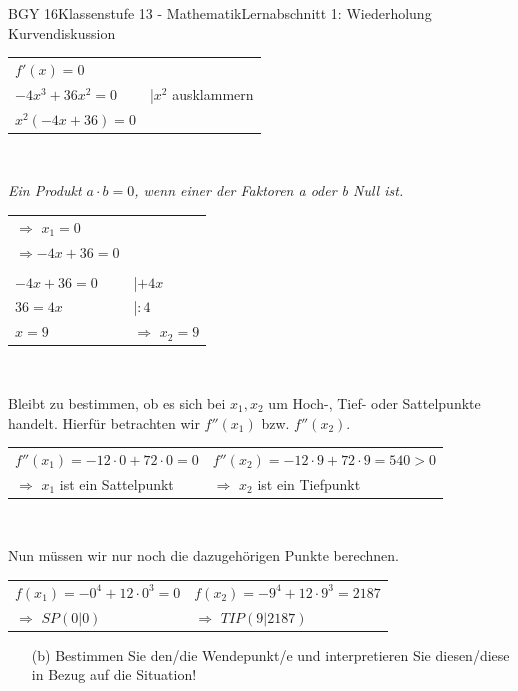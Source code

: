 \documentclass[oneside,openany,headings=optiontotoc,11pt,numbers=noenddot]{scrreprt}
\begin{document}
\begin{worksheet}{BGY 16}{Klassenstufe 13 - Mathematik}{Lernabschnitt 1: Wiederholung Kurvendiskussion}
\begin{framed}
\begin{tabularx}{\textwidth}{ll}
				\(f'(x) = 0\)\\
				\(-4x^3 + 36x^2 = 0\) & |\(x^2\) ausklammern\\
				\(x^2(-4x + 36) = 0\)\\
			\end{tabularx}\\
			\par\noindent
			\textit{Ein Produkt \(a\cdot{}b = 0\), wenn einer der Faktoren a oder b Null ist.}\\
			\par\noindent
			\begin{tabularx}{\textwidth}{ll}
				\(\Rightarrow\) \colorbox{green!5}{\( x_1 = 0\)}\\
				\(\Rightarrow -4x +36 = 0\)\\
				\\
				\(-4x+36 = 0\) & |\(+4x\)\\
				\(36 = 4x\) & |\(:4\)\\
				\(x = 9\) & \(\Rightarrow\) \colorbox{green!5}{\(x_2 = 9\)}\\
			\end{tabularx}\\
			\par\noindent
			Bleibt zu bestimmen, ob es sich bei \(x_1, x_2\) um Hoch-, Tief- oder Sattelpunkte handelt. Hierfür betrachten wir \(f''(x_1)\) bzw. \(f''(x_2)\).
			\begin{tabularx}{\textwidth}{XX}
				\(f''(x_1) = -12\cdot{}0 + 72\cdot{}0 = 0\) & \(f''(x_2) = -12\cdot{}9 + 72\cdot{}9 = 540 > 0\)\\
				\(\Rightarrow\) \colorbox{green!5}{\(x_1\) ist ein Sattelpunkt} & \(\Rightarrow\) \colorbox{green!5}{\(x_2\) ist ein Tiefpunkt}
			\end{tabularx}\\
			\par\noindent
			Nun müssen wir nur noch die dazugehörigen Punkte berechnen.\\
			\begin{tabularx}{\textwidth}{XX}
				\(f(x_1) = -0^4 + 12\cdot{}0^3 = 0\) & \(f(x_2) = -9^4 + 12\cdot{}9^3 = 2187\)\\
				\(\Rightarrow\) \colorbox{green!10}{\(SP(0|0)\)} & \(\Rightarrow\) \colorbox{green!10}{\(TIP(9|2187)\)}
			\end{tabularx}
		\end{framed}
		\begin{itemize}
			\item[(b)] Bestimmen Sie den/die Wendepunkt/e und interpretieren Sie diesen/diese in Bezug auf die Situation!

\end{itemize}
\end{worksheet}
\end{document}
